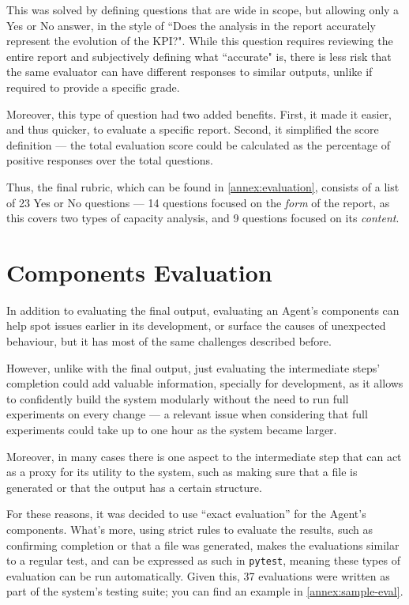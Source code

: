 \documentclass[a4paper]{report}
\begin{document}
This was solved by defining questions that are wide in scope, but allowing only a Yes or No answer, in the style of ``Does the analysis in the report accurately represent the evolution of the KPI?". While this question requires reviewing the entire report and subjectively defining what ``accurate" is, there is less risk that the same evaluator can have different responses to similar outputs, unlike if required to provide a specific grade.

Moreover, this type of question had two added benefits. First, it made it easier, and thus quicker, to evaluate a specific report. Second, it simplified the score definition --- the total evaluation score could be calculated as the percentage of positive responses over the total questions.

Thus, the final rubric, which can be found in \autoref{annex:evaluation}, consists of a list of 23 Yes or No questions --- 14 questions focused on the \textit{form} of the report, as this covers two types of capacity analysis, and 9 questions focused on its \textit{content}.

\section{Components Evaluation}
\label{sec:components-evals}

In addition to evaluating the final output, evaluating an Agent's components can help spot issues earlier in its development, or surface the causes of unexpected behaviour, but it has most of the same challenges described before.

However, unlike with the final output, just evaluating the intermediate steps' completion could add valuable information, specially for development, as it allows to confidently build the system modularly without the need to run full experiments on every change --- a relevant issue when considering that full experiments could take up to one hour as the system became larger.

Moreover, in many cases there is one aspect to the intermediate step that can act as a proxy for its utility to the system, such as making sure that a file is generated or that the output has a certain structure.

For these reasons, it was decided to use ``exact evaluation'' for the Agent's components. What's more, using strict rules to evaluate the results, such as confirming completion or that a file was generated, makes the evaluations similar to a regular test, and can be expressed as such in \texttt{pytest}, meaning these types of evaluation can be run automatically. Given this, 37 evaluations were written as part of the system's testing suite; you can find an example in \autoref{annex:sample-eval}.
\end{document}
